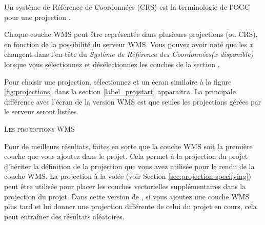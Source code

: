 Un système de Référence de Coordonnées (CRS) est la terminologie de l'OGC pour
une projection \qg.

Chaque couche WMS peut être représentée dans plusieurs projections (ou CRS), en fonction de la possibilité du serveur WMS. Vous pouvez avoir noté que les \textsl{x} changent dans l'en-tête du \textsl{Système de Référence des Coordonnées(x disponible)} lorsque vous sélectionnez et désélectionnez les couches de la section .

Pour choisir une projection, sélectionnez  et un écran similaire à la figure \ref{fig:projections} dans la section \ref{label_projstart} apparaitra. La principale différence avec l'écran de la version WMS est que seules les projections gérées par le serveur seront listées.

\begin{Tip}[ht]\caption{\textsc{Les projections WMS}}
Pour de meilleurs résultats, faites en sorte que la couche WMS soit la première couche que vous ajoutez dans le projet. Cela permet à la projection du projet d'hériter la définition de la projection que vous avez utilisée pour le rendu de la couche WMS. La projection à la volée (voir Section \ref{sec:projection-specifying}) peut être utilisée pour placer les couches vectorielles supplémentaires dans la projection du projet. Dans cette version  de \qg, si vous ajoutez une couche WMS plus tard et lui donner une projection différente de celui du projet en cours, cela peut entraîner des résultats aléatoires.
\end{Tip}

